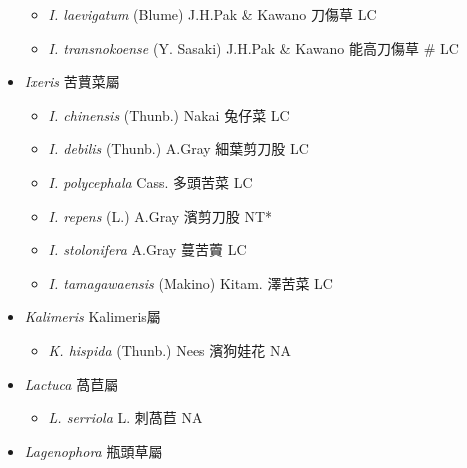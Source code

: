 \begin{itemize}
  \begin{itemize}
        \item[] \textit{I. laevigatum} (Blume) J.H.Pak \& Kawano  刀傷草   LC
        \item[] \textit{I. transnokoense} (Y. Sasaki) J.H.Pak \& Kawano  能高刀傷草  \# LC
  \end{itemize}
 \item[] \textit{Ixeris} 苦蕒菜屬
                                
  \begin{itemize}
        \item[] \textit{I. chinensis} (Thunb.) Nakai  兔仔菜   LC
        \item[] \textit{I. debilis} (Thunb.) A.Gray  細葉剪刀股   LC
        \item[] \textit{I. polycephala} Cass.  多頭苦菜   LC
        \item[] \textit{I. repens} (L.) A.Gray  濱剪刀股   NT*
        \item[] \textit{I. stolonifera} A.Gray  蔓苦藚   LC
        \item[] \textit{I. tamagawaensis} (Makino) Kitam.  澤苦菜   LC
  \end{itemize}
 \item[] \textit{Kalimeris} Kalimeris屬
                                
  \begin{itemize}
        \item[] \textit{K. hispida} (Thunb.) Nees  濱狗娃花   NA
  \end{itemize}
 \item[] \textit{Lactuca} 萵苣屬
                                
  \begin{itemize}
        \item[] \textit{L. serriola} L.  刺萵苣   NA
  \end{itemize}
 \item[] \textit{Lagenophora} 瓶頭草屬
                                

\end{itemize}

